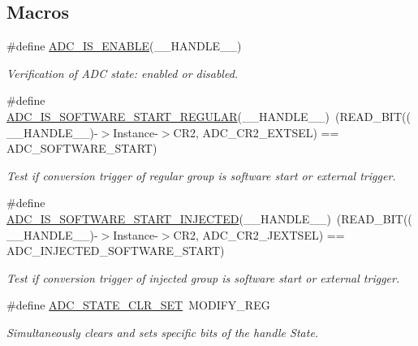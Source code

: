 \subsection*{Macros}
\begin{DoxyCompactItemize}
\item 
\#define \hyperlink{group___a_d_c___private___macros_gafe3a7a04ff078c62ae98b19403f696c7}{A\+D\+C\+\_\+\+I\+S\+\_\+\+E\+N\+A\+B\+LE}(\+\_\+\+\_\+\+H\+A\+N\+D\+L\+E\+\_\+\+\_\+)
\begin{DoxyCompactList}\small\item\em Verification of A\+DC state\+: enabled or disabled. \end{DoxyCompactList}\item 
\#define \hyperlink{group___a_d_c___private___macros_ga2ccb82ecf85d6c6d1ff2cdf9b6a82d2b}{A\+D\+C\+\_\+\+I\+S\+\_\+\+S\+O\+F\+T\+W\+A\+R\+E\+\_\+\+S\+T\+A\+R\+T\+\_\+\+R\+E\+G\+U\+L\+AR}(\+\_\+\+\_\+\+H\+A\+N\+D\+L\+E\+\_\+\+\_\+)~(R\+E\+A\+D\+\_\+\+B\+IT((\+\_\+\+\_\+\+H\+A\+N\+D\+L\+E\+\_\+\+\_\+)-\/$>$Instance-\/$>$C\+R2, A\+D\+C\+\_\+\+C\+R2\+\_\+\+E\+X\+T\+S\+EL) == A\+D\+C\+\_\+\+S\+O\+F\+T\+W\+A\+R\+E\+\_\+\+S\+T\+A\+RT)
\begin{DoxyCompactList}\small\item\em Test if conversion trigger of regular group is software start or external trigger. \end{DoxyCompactList}\item 
\#define \hyperlink{group___a_d_c___private___macros_gaa3a1c2197a097b9bb8159b6eb1ac8941}{A\+D\+C\+\_\+\+I\+S\+\_\+\+S\+O\+F\+T\+W\+A\+R\+E\+\_\+\+S\+T\+A\+R\+T\+\_\+\+I\+N\+J\+E\+C\+T\+ED}(\+\_\+\+\_\+\+H\+A\+N\+D\+L\+E\+\_\+\+\_\+)~(R\+E\+A\+D\+\_\+\+B\+IT((\+\_\+\+\_\+\+H\+A\+N\+D\+L\+E\+\_\+\+\_\+)-\/$>$Instance-\/$>$C\+R2, A\+D\+C\+\_\+\+C\+R2\+\_\+\+J\+E\+X\+T\+S\+EL) == A\+D\+C\+\_\+\+I\+N\+J\+E\+C\+T\+E\+D\+\_\+\+S\+O\+F\+T\+W\+A\+R\+E\+\_\+\+S\+T\+A\+RT)
\begin{DoxyCompactList}\small\item\em Test if conversion trigger of injected group is software start or external trigger. \end{DoxyCompactList}\item 
\#define \hyperlink{group___a_d_c___private___macros_gaaf93e91b164d4a220aae475eff82665f}{A\+D\+C\+\_\+\+S\+T\+A\+T\+E\+\_\+\+C\+L\+R\+\_\+\+S\+ET}~M\+O\+D\+I\+F\+Y\+\_\+\+R\+EG
\begin{DoxyCompactList}\small\item\em Simultaneously clears and sets specific bits of the handle State. \end{DoxyCompactList}\item 

\end{DoxyCompactItemize}
